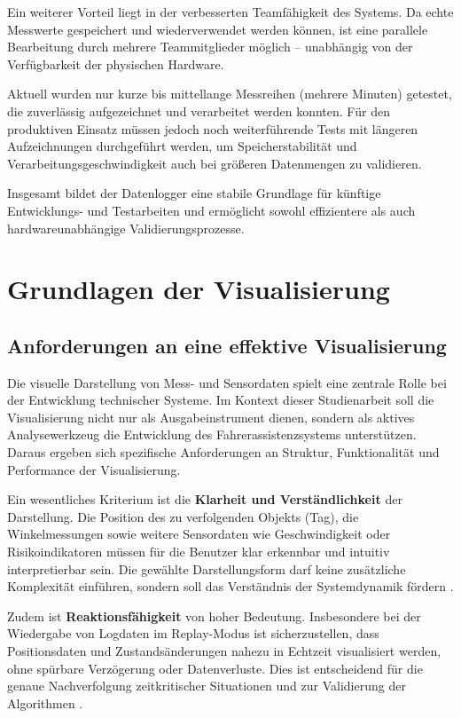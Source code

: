 \documentclass[a4paper, 12pt]{article} %
\begin{document}
Ein weiterer Vorteil liegt in der verbesserten Teamfähigkeit des Systems. Da echte Messwerte gespeichert und wiederverwendet werden können, 
ist eine parallele Bearbeitung durch mehrere Teammitglieder möglich – unabhängig von der Verfügbarkeit der physischen Hardware.

Aktuell wurden nur kurze bis mittellange Messreihen (mehrere Minuten) getestet, die zuverlässig aufgezeichnet und verarbeitet werden konnten. 
Für den produktiven Einsatz müssen jedoch noch weiterführende Tests mit längeren Aufzeichnungen durchgeführt werden, um Speicherstabilität und 
Verarbeitungsgeschwindigkeit auch bei größeren Datenmengen zu validieren.

Insgesamt bildet der Datenlogger eine stabile Grundlage für künftige Entwicklungs- und Testarbeiten und ermöglicht sowohl effizientere als auch 
hardwareunabhängige Validierungsprozesse.

\section{Grundlagen der Visualisierung}
\subsection{Anforderungen an eine effektive Visualisierung}

Die visuelle Darstellung von Mess- und Sensordaten spielt eine zentrale Rolle bei der Entwicklung technischer Systeme. 
Im Kontext dieser Studienarbeit soll die Visualisierung nicht nur als Ausgabeinstrument dienen, sondern als aktives Analysewerkzeug die 
Entwicklung des Fahrerassistenzsystems unterstützen. Daraus ergeben sich spezifische Anforderungen an Struktur, Funktionalität und Performance der 
Visualisierung.

Ein wesentliches Kriterium ist die \textbf{Klarheit und Verständlichkeit} der Darstellung. Die Position des zu 
verfolgenden Objekts (Tag), die Winkelmessungen sowie weitere Sensordaten wie Geschwindigkeit oder Risikoindikatoren müssen 
für die Benutzer klar erkennbar und intuitiv interpretierbar sein. Die gewählte Darstellungsform darf keine zusätzliche Komplexität 
einführen, sondern soll das Verständnis der Systemdynamik fördern \cite{tkinter_guidelines}.

Zudem ist \textbf{Reaktionsfähigkeit} von hoher Bedeutung. Insbesondere bei der Wiedergabe von Logdaten im Replay-Modus ist sicherzustellen, 
dass Positionsdaten und Zustandsänderungen nahezu in Echtzeit visualisiert werden, ohne spürbare Verzögerung oder Datenverluste. Dies ist entscheidend
für die genaue Nachverfolgung zeitkritischer Situationen und zur Validierung der Algorithmen \cite{realtime_visualization}.
\end{document}
